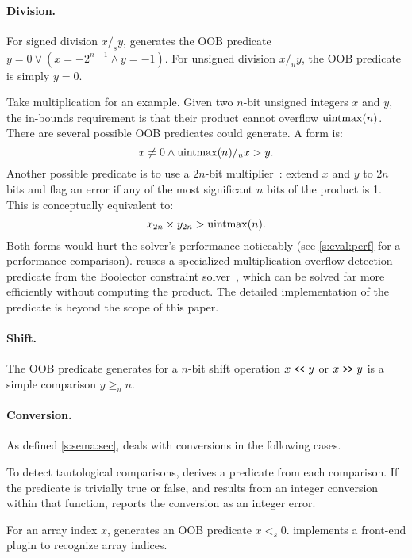 \paragraph{Division.}
For signed division $x /_s y$, \sys generates the OOB predicate
$y = 0 \lor (x = -2^{n-1} \land y = -1)$.
For unsigned division $x /_u y$, the OOB predicate is simply
$y = 0$.

Take multiplication for an example.  Given two $n$-bit unsigned
integers $x$ and $y$, the in-bounds requirement is that their product
cannot overflow $\operatorname{uintmax}(n)$.  There are several possible OOB
predicates \sys could generate.
A \naive form is:
\begin{equation*}
x \neq 0 \land \operatorname{uintmax}(n) /_u x > y.
\end{equation*}
Another possible predicate is to use a $2n$-bit
multiplier~\cite{molnar:catchconv}: extend $x$ and $y$ to $2n$ bits
and flag an error if any of the most significant $n$ bits of the
product is 1.  This is conceptually equivalent to:
\begin{equation*}
x_{2n} \times y_{2n} > \operatorname{uintmax}(n).
\end{equation*}
Both forms would hurt the solver's performance noticeably
(see \autoref{s:eval:perf} for a performance comparison).
%
\sys reuses a specialized multiplication overflow detection predicate
from the Boolector constraint
solver~\cite[\chapterautorefname~3.5]{brummayer:phd}, which can be
solved far more efficiently without computing the product.  The
detailed implementation of the predicate is beyond the scope of
this paper.
\fi

\paragraph{Shift.}
The OOB predicate \sys generates for a $n$-bit shift operation
$x \shl y$ or $x \shr y$ is a simple comparison $y \geq_u n$.

\paragraph{Conversion.}
As defined \autoref{s:sema:sec}, \sys deals with conversions
in the following cases.

To detect tautological comparisons, \sys derives a predicate from
each comparison.  If the predicate is trivially true or false,
and results from an integer conversion within that function, \sys
reports the conversion as an integer error.

For an array index $x$, \sys generates an OOB predicate $x <_s 0$.
\sys implements a front-end plugin to recognize array indices.

